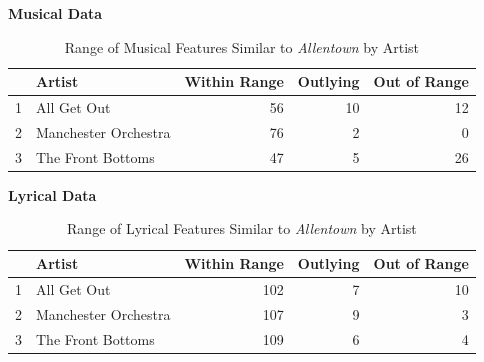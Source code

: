 \documentclass{article}\usepackage[]{graphicx}\usepackage[]{xcolor}
\begin{document}
\begin{table}[H]
\centering
\caption*{\textbf{Musical Data}}
\begin{tabular}{rlrrr}
  \hline
 & Artist & Within Range & Outlying & Out of Range \\ 
  \hline
1 & All Get Out & 56 & 10 & 12 \\ 
  2 & Manchester Orchestra & 76 & 2 & 0 \\ 
  3 & The Front Bottoms & 47 & 5 & 26 \\ 
   \hline
\end{tabular}
\caption*{Range of Musical Features Similar to \emph{Allentown} by Artist}
\label{MusicalTable}
\end{table}


\begin{table}[H]
\centering
\caption*{\textbf{Lyrical Data}}
\begin{tabular}{rlrrr}
  \hline
 & Artist & Within Range & Outlying & Out of Range \\ 
  \hline
1 & All Get Out & 102 & 7 & 10 \\ 
  2 & Manchester Orchestra & 107 & 9 & 3 \\ 
  3 & The Front Bottoms & 109 & 6 & 4 \\ 
   \hline
\end{tabular}
\caption*{Range of Lyrical Features Similar to \emph{Allentown} by Artist}
\label{LyricalTable}
\end{table}
\end{document}
